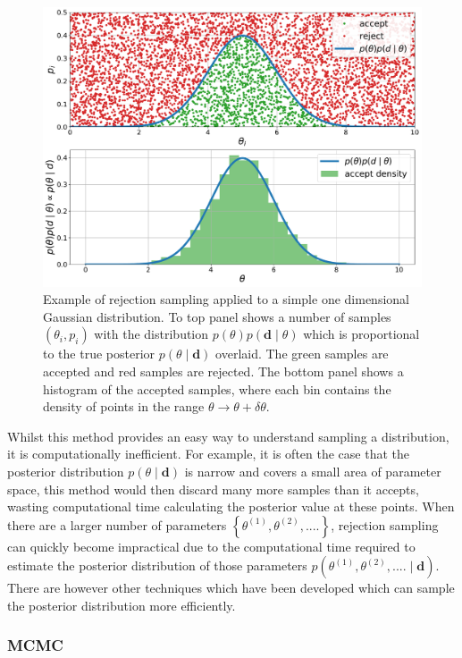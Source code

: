 %
\begin{figure}[ht]
	\centering
	\includegraphics[width=0.8\linewidth]{C2_cw/reject_sample.pdf}
        \caption[Rejection sampling example]{Example of rejection sampling
applied to a simple one dimensional Gaussian distribution. To top panel shows a
number of samples $(\theta_i, p_i)$ with the distribution $p( \theta)p({\bm d} \mid \theta)$ which is proportional to the true posterior $p(\theta \mid \bm{d})$
overlaid. The green samples are accepted and red samples are rejected.
The bottom panel shows a histogram of the accepted samples, where each bin
contains the density of points in the range $\theta \rightarrow \theta + \delta
\theta$.} \label{cwinto:bayes:sampling:rejection}
\end{figure}
%

Whilst this method provides an easy way to understand sampling a distribution, it is computationally inefficient. For example, it is often the case that the posterior distribution $p(\theta \mid \bm{d})$ is narrow and covers a small area of parameter space, this method would then discard many more samples than it accepts, wasting computational time calculating the posterior value at these points. 
When there are a larger number of parameters $\left\{\theta^{(1)},\theta^{(2)}, ....\right\}$, rejection sampling can quickly become impractical due to the computational time required to estimate the posterior distribution of those parameters $p(\theta^{(1)},\theta^{(2)}, .... \mid \bm{d})$.
There are however other techniques which have been developed which can sample the posterior distribution more efficiently.

%
\subsubsection{MCMC}
%

